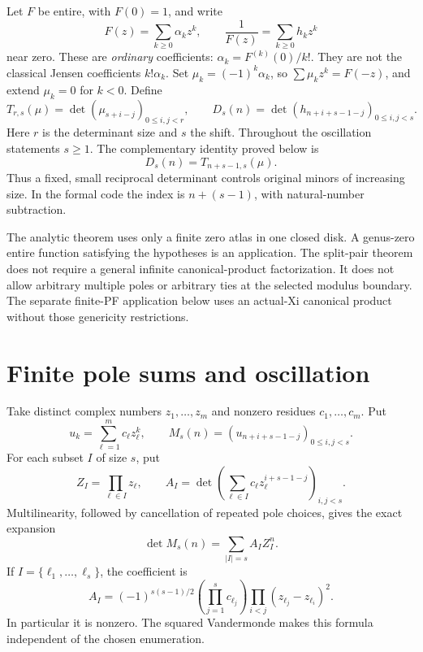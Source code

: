 \documentclass[11pt]{amsart}
\begin{document}
Let $F$ be entire, with $F(0)=1$, and write
\[
 F(z)=\sum_{k\ge0}\alpha_k z^k,\qquad
 \frac1{F(z)}=\sum_{k\ge0}h_k z^k
\]
near zero. These are \emph{ordinary} coefficients:
$\alpha_k=F^{(k)}(0)/k!$. They are not the classical Jensen coefficients $k!\alpha_k$.
Set $\mu_k=(-1)^k\alpha_k$, so $\sum\mu_kz^k=F(-z)$, and extend $\mu_k=0$ for $k<0$. Define
\[
 T_{r,s}(\mu)=\det(\mu_{s+i-j})_{0\le i,j<r},\qquad
 D_s(n)=\det(h_{n+i+s-1-j})_{0\le i,j<s}.
\]
Here $r$ is the determinant size and $s$ the shift. Throughout the oscillation statements $s\ge1$. The complementary identity proved below is
\begin{equation}\label{eq:jacobi}
 D_s(n)=T_{n+s-1,s}(\mu).
\end{equation}
Thus a fixed, small reciprocal determinant controls original minors of increasing size. In the formal code the index is $n+(s-1)$, with natural-number subtraction.

The analytic theorem uses only a finite zero atlas in one closed disk. A genus-zero entire function satisfying the hypotheses is an application. The split-pair theorem does not require a general infinite canonical-product factorization. It does not allow arbitrary multiple poles or arbitrary ties at the selected modulus boundary. The separate finite-PF application below uses an actual-Xi canonical product without those genericity restrictions.

\section{Finite pole sums and oscillation}
Take distinct complex numbers $z_1,\ldots,z_m$ and nonzero residues $c_1,\ldots,c_m$. Put
\[
 u_k=\sum_{\ell=1}^m c_\ell z_\ell^k,\qquad
 M_s(n)=(u_{n+i+s-1-j})_{0\le i,j<s}.
\]
For each subset $I$ of size $s$, put
\[
 Z_I=\prod_{\ell\in I}z_\ell,\qquad
 A_I=\det\left(\sum_{\ell\in I}c_\ell z_\ell^{i+s-1-j}\right)_{i,j<s}.
\]
Multilinearity, followed by cancellation of repeated pole choices, gives the exact expansion
\begin{equation}\label{eq:subset}
 \det M_s(n)=\sum_{|I|=s} A_I Z_I^n.
\end{equation}
If $I=\{\ell_1,\ldots,\ell_s\}$, the coefficient is
\begin{equation}\label{eq:leading}
 A_I=(-1)^{s(s-1)/2}
       \left(\prod_{j=1}^s c_{\ell_j}\right)
       \prod_{i<j}(z_{\ell_j}-z_{\ell_i})^2.
\end{equation}
In particular it is nonzero. The squared Vandermonde makes this formula independent of the chosen enumeration.
\end{document}
